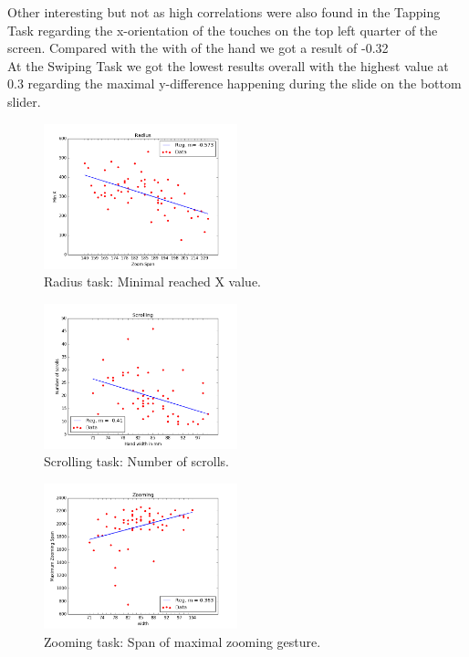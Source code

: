 \documentclass{sigchi}
\begin{document}
Other interesting but not as high correlations were also found in the Tapping Task regarding the x-orientation of the touches on the top left quarter of the screen. Compared with the with of the hand we got a result of -0.32\\
At the Swiping Task we got the lowest results overall with the highest value at 0.3 regarding the maximal y-difference happening during the slide on the bottom slider.

\begin{figure}[ht]
	\centering
  \includegraphics[width=0.5\textwidth]{figures/plotRadius.png}
	\caption{Radius task: Minimal reached X value.}
	\label{plotRadius}
\end{figure}

\begin{figure}[ht]
	\centering
  \includegraphics[width=0.5\textwidth]{figures/plotScrolling.png}
	\caption{Scrolling task: Number of scrolls.}
	\label{plotScrolling}
\end{figure}

\begin{figure}[ht]
	\centering
  \includegraphics[width=0.5\textwidth]{figures/plotZooming02.png}
	\caption{Zooming task: Span of maximal zooming gesture.}
	\label{plotZooming}
\end{figure}
\end{document}
